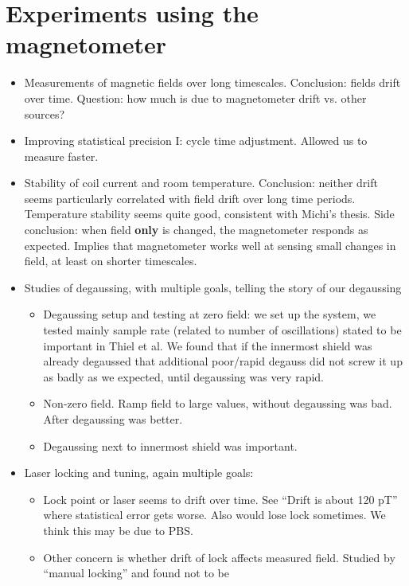 \chapter{Experiments using the magnetometer\label{ch:results}}


\begin{itemize}
\item Measurements of magnetic fields over long timescales.
  Conclusion: fields drift over time.  Question: how much is due to
  magnetometer drift vs. other sources?
\item Improving statistical precision I: cycle time adjustment.
  Allowed us to measure faster.
\item Stability of coil current and room temperature.  Conclusion:
  neither drift seems particularly correlated with field drift over
  long time periods.  Temperature stability seems quite good,
  consistent with Michi's thesis.  Side conclusion: when field {\bf
    only} is changed, the magnetometer responds as expected.  Implies
  that magnetometer works well at sensing small changes in field, at
  least on shorter timescales.
\item Studies of degaussing, with multiple goals, telling the story of
  our degaussing
  \begin{itemize}
    \item Degaussing setup and testing at zero field: we set up the
      system, we tested mainly sample rate (related to number of
      oscillations) stated to be important in Thiel et al.  We found
      that if the innermost shield was already degaussed that
      additional poor/rapid degauss did not screw it up as badly as we
      expected, until degaussing was very rapid.
    \item Non-zero field.  Ramp field to large values, without
      degaussing was bad.  After degaussing was better.
    \item Degaussing next to innermost shield was important.
  \end{itemize}
\item Laser locking and tuning, again multiple goals:
  \begin{itemize}
    \item Lock point or laser seems to drift over time.  See ``Drift
      is about 120 pT'' where statistical error gets worse.  Also
      would lose lock sometimes.  We think this may be due to PBS.
    \item Other concern is whether drift of lock affects measured
      field.  Studied by ``manual locking'' and found not to be

\end{itemize}
\end{itemize}
